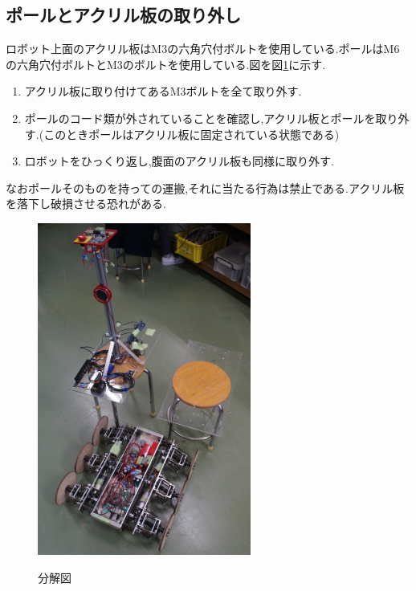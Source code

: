 \subsection{ポールとアクリル板の取り外し}
ロボット上面のアクリル板はM3の六角穴付ボルトを使用している.ポールはM6の六角穴付ボルトとM3のボルトを使用している.図を図\ref{fig:bunkai1}に示す.

\begin{enumerate}
 \item アクリル板に取り付けてあるM3ボルトを全て取り外す.
 \item ポールのコード類が外されていることを確認し,アクリル板とポールを取り外す.(このときポールはアクリル板に固定されている状態である)
 \item ロボットをひっくり返し,腹面のアクリル板も同様に取り外す.
\end{enumerate}
なおポールそのものを持っての運搬,それに当たる行為は禁止である.アクリル板を落下し破損させる恐れがある.

\begin{figure}[htp]
 \begin{center}
  \includegraphics[width=70mm]{img/hard/f11.jpg}
 　\caption{分解図}
  \label{fig:bunkai1}%
 \end{center}
\end{figure}



